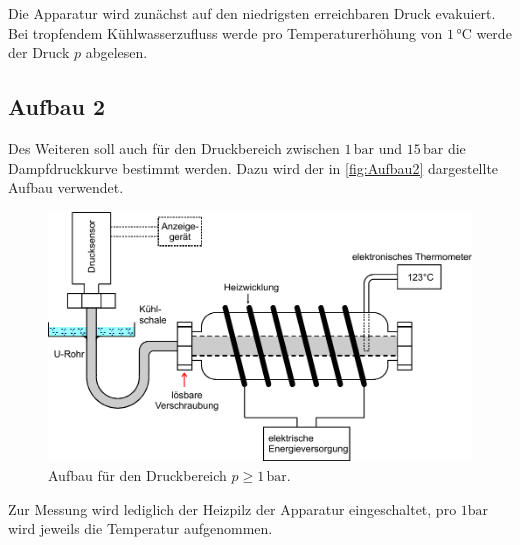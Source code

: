 Die Apparatur wird zunächst auf den niedrigsten erreichbaren Druck evakuiert.
Bei tropfendem Kühlwasserzufluss werde pro Temperaturerhöhung von $1 \,\unit{\celsius}$
werde der Druck $p$ abgelesen.


\subsection{Aufbau 2}

Des Weiteren soll auch für den Druckbereich zwischen $1 \,\unit{\bar}$ und $15 \,\unit{\bar}$ die 
Dampfdruckkurve bestimmt werden.
Dazu wird der in \autoref{fig:Aufbau2} dargestellte Aufbau verwendet.

\begin{figure}[H]
    \centering
    \includegraphics{Aufbau 2.pdf}
    \caption{Aufbau für den Druckbereich $p \geq 1 \,\unit{\bar}$\cite{ap06}.}
\end{figure}

Zur Messung wird lediglich der Heizpilz der Apparatur eingeschaltet, pro $1 \unit{\bar}$ wird jeweils die
Temperatur aufgenommen.


